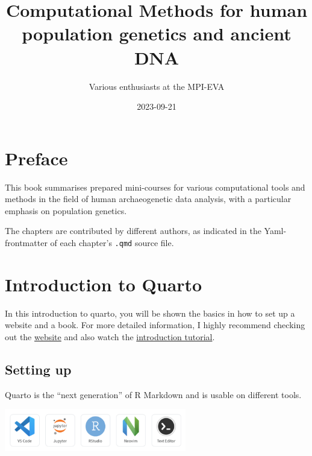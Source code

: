 \documentclass[
  letterpaper,
  DIV=11,
  numbers=noendperiod]{scrreprt}
\title{Computational Methods for human population genetics and ancient
DNA}
\author{Various enthusiasts at the MPI-EVA}
\date{2023-09-21}
\renewcommand*\contentsname{Table of contents}
\newcommand\contentsname{Table of contents}
\begin{document}
\maketitle
\ifdefined\Shaded\renewenvironment{Shaded}{\begin{tcolorbox}[boxrule=0pt, sharp corners, breakable, borderline west={3pt}{0pt}{shadecolor}, frame hidden, enhanced, interior hidden]}{\end{tcolorbox}}\fi

\renewcommand*\contentsname{Table of contents}
{
\hypersetup{linkcolor=}
\setcounter{tocdepth}{2}
\tableofcontents
}

\hypertarget{preface}{%
\chapter*{Preface}\label{preface}}


This book summarises prepared mini-courses for various computational
tools and methods in the field of human archaeogenetic data analysis,
with a particular emphasis on population genetics.

The chapters are contributed by different authors, as indicated in the
Yaml-frontmatter of each chapter's \texttt{.qmd} source file.


\hypertarget{introduction-to-quarto}{%
\chapter{Introduction to Quarto}\label{introduction-to-quarto}}

In this introduction to quarto, you will be shown the basics in how to
set up a website and a book. For more detailed information, I highly
recommend checking out the \href{https://quarto.org}{website} and also
watch the \href{https://youtu.be/_f3latmOhew}{introduction tutorial}.

\hypertarget{setting-up}{%
\section{Setting up}\label{setting-up}}

Quarto is the ``next generation'' of R Markdown and is usable on
different tools.

\includegraphics[width=3.125in,height=\textheight]{img/quarto_intro/Picture 1.png}
\end{document}
